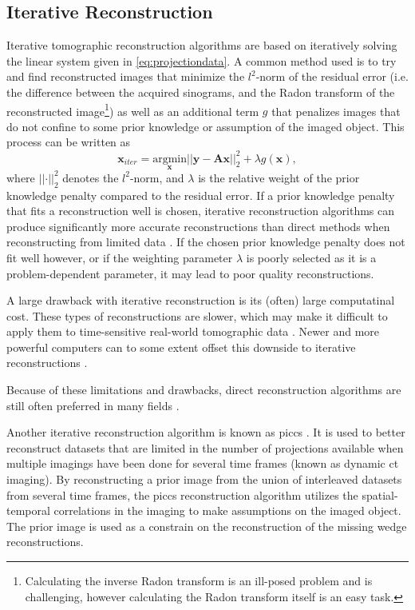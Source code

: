 \subsection{Iterative Reconstruction}
Iterative tomographic reconstruction algorithms are based on iteratively solving the linear system given in \cref{eq:projectiondata}. A common method used is to try and find reconstructed images that minimize the $l^2$-norm of the residual error (i.e. the difference between the acquired sinograms, and the Radon transform of the reconstructed image\footnote{Calculating the inverse Radon transform is an ill-posed problem and is challenging, however calculating the Radon transform itself is an easy task. }) as well as an additional term $g$ that penalizes images that do not confine to some prior knowledge or assumption of the imaged object. This process can be written as \cite{jimaging4110128}
\begin{equation}
    \label{eq:iterativesolution}
    \bm{x}_{iter} = \underset{\bm{x}}{\text{argmin}} \left|\left|\bm{y} - \bm{A}\bm{x}\right|\right|_2^2 + \lambda g(\bm{x}),
\end{equation}
where $\left|\left| \bm{\cdot} \right|\right|_2^2$ denotes the $l^2$-norm, and $\lambda$ is the relative weight of the prior knowledge penalty compared to the residual error. If a prior knowledge penalty that fits a reconstruction well is chosen, iterative reconstruction algorithms can produce significantly more accurate reconstructions than direct methods when reconstructing from limited data \cite{jimaging4110128}. If the chosen prior knowledge penalty does not fit well however, or if the weighting parameter $\lambda$ is poorly selected as it is a problem-dependent parameter, it may lead to poor quality reconstructions. 

A large drawback with iterative reconstruction is its (often) large computatinal cost. These types of reconstructions are slower, which may make it difficult to apply them to time-sensitive real-world tomographic data \cite{jimaging4110128}. Newer and more powerful computers can to some extent offset this downside to iterative reconstructions \cite{willemink2013iterative}. 

Because of these limitations and drawbacks, direct reconstruction algorithms are still often preferred in many fields \cite{Pan_2009}. 

Another iterative reconstruction algorithm is known as \acrfull{piccs} \cite{piccs}. It is used to better reconstruct datasets that are limited in the number of projections available when multiple imagings have been done for several time frames (known as dynamic \acrshort{ct} imaging). By reconstructing a prior image from the union of interleaved datasets from several time frames, the \acrshort{piccs} reconstruction algorithm utilizes the spatial-temporal correlations in the imaging to make assumptions on the imaged object. The prior image is used as a constrain on the reconstruction of the missing wedge reconstructions. 


